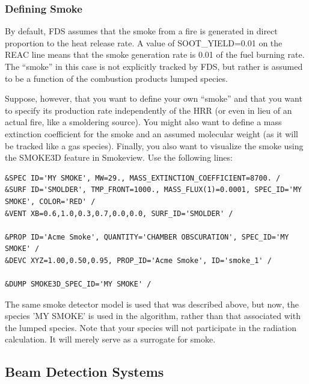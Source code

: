 \documentclass[11pt]{book}
\begin{document}
\subsubsection{Defining Smoke}
\label{info:alternative_smoke}

By default, FDS assumes that the smoke from a fire is generated in direct proportion to the heat release rate. A value of {\ct SOOT\_YIELD=0.01} on the {\ct REAC} line means that the smoke generation rate is 0.01 of the fuel burning rate. The ``smoke'' in this case is not explicitly tracked by FDS, but rather is assumed to be a function of the combustion products lumped species.

Suppose, however, that you want to define your own ``smoke'' and that you want to specify its production rate independently of the HRR (or even in lieu of an actual fire, like a smoldering source). You might also want to define a mass extinction coefficient for the smoke and an assumed molecular weight (as it will be tracked like a gas species). Finally, you also want to visualize the smoke using the {\ct SMOKE3D} feature in Smokeview. Use the following lines:
\begin{lstlisting}
&SPEC ID='MY SMOKE', MW=29., MASS_EXTINCTION_COEFFICIENT=8700. /
&SURF ID='SMOLDER', TMP_FRONT=1000., MASS_FLUX(1)=0.0001, SPEC_ID='MY SMOKE', COLOR='RED' /
&VENT XB=0.6,1.0,0.3,0.7,0.0,0.0, SURF_ID='SMOLDER' /

&PROP ID='Acme Smoke', QUANTITY='CHAMBER OBSCURATION', SPEC_ID='MY SMOKE' /
&DEVC XYZ=1.00,0.50,0.95, PROP_ID='Acme Smoke', ID='smoke_1' /

&DUMP SMOKE3D_SPEC_ID='MY SMOKE' /
\end{lstlisting}
The same smoke detector model is used that was described above, but now, the species {\ct 'MY SMOKE'} is used in the algorithm, rather than that associated with the lumped species. Note that your species will not participate in the radiation calculation. It will merely serve as a surrogate for smoke.



\subsection{Beam Detection Systems}
\label{info:beam_detector}
\end{document}

